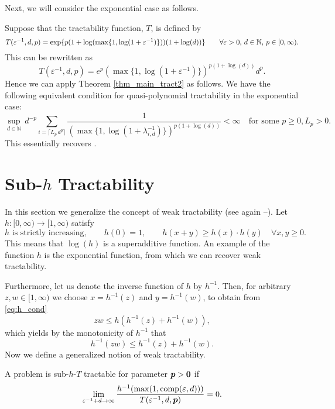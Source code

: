 \documentclass[sort&compress]{elsarticle}
\begin{document}
Next, we will consider the exponential case as follows.
\begin{example}

\noindent Suppose that the tractability function, $T$, is defined by
\[
 T(\varepsilon^{-1},d,p)= \exp \{p(1+\log(\max\{1,\log(1+\varepsilon^{-1})\}))(1+\log (d))\}  \qquad \forall \varepsilon > 0, \,  d \in \mathbb{N}, \, p\in [0,\infty).
\] This can be rewritten as
\[
T(\varepsilon^{-1},d,p) = e^p(\max\{1,\log(1+\varepsilon^{-1})\})^{p(1+\log (d))}d^p.
\]
Hence we can apply Theorem \ref{thm_main_tract2} as follows. We have the following equivalent condition for quasi-polynomial tractability in the exponential case:
\[
\sup_{d\in\mathbb{N}}\,d^{-p}\sum_{i=\lceil L_p\,d^{p}\rceil} \frac{1}{\left(\max\{1,\log(1+\lambda_{i,d}^{-1})\} \right)^{p(1+\log (d))}}< \infty \quad \text{for some } p \geq 0, L_p >0.
\]
This essentially recovers \cite[Theorem 2]{KriWoz19a}.
\end{example}






\section{Sub-$h$ Tractability}\label{sec:subh}
In this section we generalize the concept of weak tractability (see again \cite{NovWoz08a}--\cite{NovWoz12a}).  Let  $h:[0,\infty) \to [1,\infty)$ satisfy
\begin{equation} \label{eq:h_cond}
	h \text{ is strictly increasing}, \qquad
	h(0)=1, \qquad
 h(x+y) \ge  h(x)\cdot h(y)  \quad \forall x,y \ge 0.
\end{equation}
This means that $\log(h)$ is a superadditive function.  An example of the function $h$ is the exponential function, from which we can recover weak tractability.

Furthermore, let us denote the inverse function of $h$ by $h^{-1}$.
Then, for arbitrary $z,w \in [1,\infty)$ we choose $x=h^{-1}(z)$ and $y=h^{-1}(w)$, to obtain from \eqref{eq:h_cond}
\[
z w \le h (h^{-1}(z)+h^{-1}(w)),
\]
which yields by the monotonicity of $h^{-1}$ that
\begin{equation}\label{eq:submult_h_inverse}
h^{-1}(z w) \le h^{-1}(z)+h^{-1}(w).
\end{equation}
Now we define a generalized notion of weak tractability.
\begin{definition} \label{def:subhT}
	A problem is sub-$h$-$T$ tractable for parameter $\boldsymbol{p} > \boldsymbol{0}$ if
	\begin{equation*}
		\lim_{\varepsilon^{-1} + d \to \infty} \frac{h^{-1}(\max(1,\operatorname{comp}(\varepsilon,d)))}{T(\varepsilon^{-1},d,\boldsymbol{p})} = 0.
	\end{equation*}
\end{definition}
\end{document}
